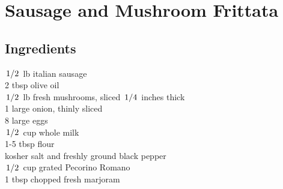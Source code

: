 \documentclass{article}
\begin{document}
\newcommand{\slfrac}[2]{\left.#1\middle/#2\right.}
\newcommand{\degree}{\ensuremath{^\circ}}

\section*{Sausage and Mushroom Frittata}



\subsection*{Ingredients}
$\slfrac{1}{2}$ lb italian sausage\\
2 tbsp olive oil\\
$\slfrac{1}{2}$ lb fresh mushrooms, sliced $\slfrac{1}{4}$ inches thick\\
1 large onion, thinly sliced\\
8 large eggs\\
$\slfrac{1}{2}$ cup whole milk\\
1-5 tbsp flour\\
kosher salt and freshly ground black pepper\\
$\slfrac{1}{2}$ cup grated Pecorino Romano\\
1 tbsp chopped fresh marjoram\\
\end{document}
